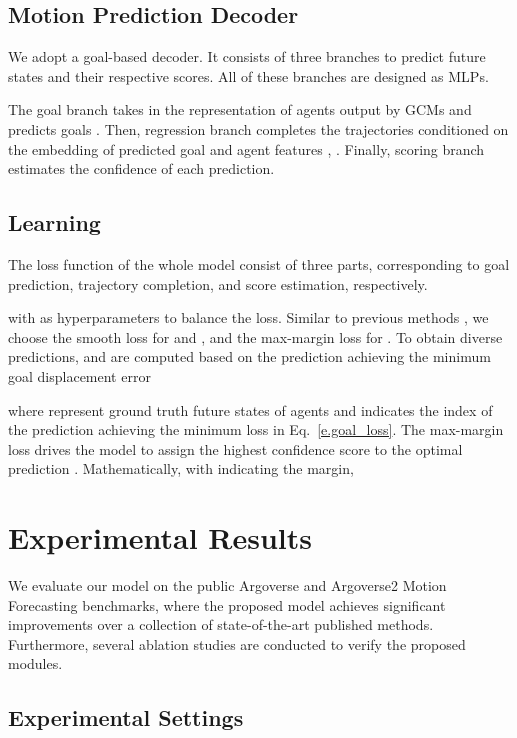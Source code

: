 \documentclass[letterpaper, 10 pt, conference]{ieeeconf}
\begin{document}
\subsection{Motion Prediction Decoder}
\label{sec,pred}
We adopt a goal-based decoder. It consists of three branches to predict  future states and their respective scores.  All of these branches are designed as MLPs. 

The goal branch takes in the representation of agents output by GCMs  and predicts  goals . Then, regression branch completes the trajectories  conditioned on the embedding of  predicted goal  and agent features , . 
Finally, scoring branch estimates the confidence  of each prediction. 

\subsection{Learning}\label{sec.learn}
The loss function of the whole model consist of three parts, corresponding to goal prediction, trajectory completion, and score estimation, respectively.

with  as hyperparameters to balance the loss. Similar to previous methods \cite{liang2020learning,zeng2021lanercnn}, we choose the smooth  loss   for  and , and the max-margin loss for . To obtain diverse predictions,  and  are computed based on the prediction achieving the minimum goal displacement error


where  represent ground truth future states of agents and   indicates the index of the prediction achieving the minimum loss in Eq.~\eqref{e.goal_loss}.  The max-margin loss drives the model to assign the highest confidence score to the optimal prediction . Mathematically, with  indicating the margin,


\section{Experimental Results}
We evaluate our model on the public Argoverse and Argoverse2 Motion Forecasting benchmarks, where the proposed model achieves significant improvements over a collection of state-of-the-art published methods. Furthermore, several ablation studies are conducted to verify the proposed modules.

\label{sec:result}
\subsection{Experimental Settings}
\end{document}
